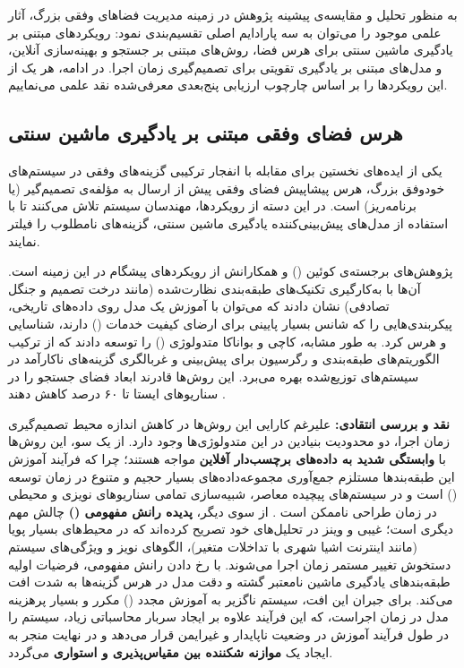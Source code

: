 \documentclass[oneside,openany,phd]{TMU-Thesis}
\begin{document}
به منظور تحلیل و مقایسه‌ی پیشینه پژوهش در زمینه مدیریت فضاهای وفقی بزرگ، آثار علمی موجود را می‌توان به سه پارادایم اصلی تقسیم‌بندی نمود: رویکردهای مبتنی بر یادگیری ماشین سنتی برای هرس فضا، روش‌های مبتنی بر جستجو و بهینه‌سازی آنلاین، و مدل‌های مبتنی بر یادگیری تقویتی برای تصمیم‌گیری زمان اجرا. در ادامه، هر یک از این رویکردها را بر اساس چارچوب ارزیابی پنج‌بعدی معرفی‌شده نقد علمی می‌نماییم.

\subsection{هرس فضای وفقی مبتنی بر یادگیری ماشین سنتی}
\label{sec:ch3_ml_pruning}

یکی از ایده‌های نخستین برای مقابله با انفجار ترکیبی گزینه‌های وفقی در سیستم‌های خودوفق بزرگ، هرس پیشاپیش فضای وفقی پیش از ارسال به مؤلفه‌ی تصمیم‌گیر (یا برنامه‌ریز) است. در این دسته از رویکردها، مهندسان سیستم تلاش می‌کنند تا با استفاده از مدل‌های پیش‌بینی‌کننده یادگیری ماشین سنتی، گزینه‌های نامطلوب را فیلتر نمایند.

پژوهش‌های برجسته‌ی کوئین () و همکارانش \cite{quin2019efficient, quin2022reducing} از رویکردهای پیشگام در این زمینه است. آن‌ها با به‌کارگیری تکنیک‌های طبقه‌بندی نظارت‌شده (مانند درخت تصمیم و جنگل تصادفی) نشان دادند که می‌توان با آموزش یک مدل روی داده‌های تاریخی، پیکربندی‌هایی را که شانس بسیار پایینی برای ارضای کیفیت خدمات () دارند، شناسایی و هرس کرد. به طور مشابه، کاچی و بواناکا \cite{kachi2023hybrid} متدولوژی  () را توسعه دادند که از ترکیب الگوریتم‌های طبقه‌بندی و رگرسیون برای پیش‌بینی و غربالگری گزینه‌های ناکارآمد در سیستم‌های توزیع‌شده بهره می‌برد. این روش‌ها قادرند ابعاد فضای جستجو را در سناریوهای ایستا تا ۶۰ درصد کاهش دهند \cite{kachi2023hybrid}.

\textbf{نقد و بررسی انتقادی:}
علیرغم کارایی این روش‌ها در کاهش اندازه محیط تصمیم‌گیری زمان اجرا، دو محدودیت بنیادین در این متدولوژی‌ها وجود دارد.
از یک سو، این روش‌ها با \textbf{وابستگی شدید به داده‌های برچسب‌دار آفلاین} مواجه هستند؛ چرا که فرآیند آموزش این طبقه‌بندها مستلزم جمع‌آوری مجموعه‌داده‌های بسیار حجیم و متنوع در زمان توسعه () است و در سیستم‌های پیچیده معاصر، شبیه‌سازی تمامی سناریوهای نویزی و محیطی در زمان طراحی ناممکن است \cite{quin2022reducing, gheibi2024dealing}.
از سوی دیگر، \textbf{پدیده رانش مفهومی ()} چالش مهم دیگری است؛ غیبی و وینز \cite{gheibi2024dealing} در تحلیل‌های خود تصریح کرده‌اند که در محیط‌های بسیار پویا (مانند اینترنت اشیا شهری با تداخلات متغیر)، الگوهای نویز و ویژگی‌های سیستم دستخوش تغییر مستمر زمان اجرا می‌شوند. با رخ دادن رانش مفهومی، فرضیات اولیه طبقه‌بندهای یادگیری ماشین نامعتبر گشته و دقت مدل در هرس گزینه‌ها به شدت افت می‌کند. برای جبران این افت، سیستم ناگزیر به آموزش مجدد () مکرر و بسیار پرهزینه مدل در زمان اجراست، که این فرآیند علاوه بر ایجاد سربار محاسباتی زیاد، سیستم را در طول فرآیند آموزش در وضعیت ناپایدار و غیرایمن قرار می‌دهد و در نهایت منجر به ایجاد یک \textbf{موازنه شکننده بین مقیاس‌پذیری و استواری} می‌گردد.
\end{document}
